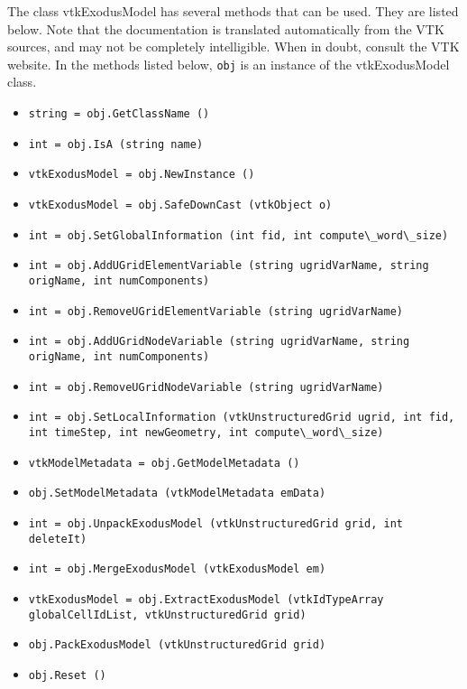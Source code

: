 The class vtkExodusModel has several methods that can be used.
  They are listed below.
Note that the documentation is translated automatically from the VTK sources,
and may not be completely intelligible.  When in doubt, consult the VTK website.
In the methods listed below, \verb|obj| is an instance of the vtkExodusModel class.
\begin{itemize}
\item  \verb|string = obj.GetClassName ()|

\item  \verb|int = obj.IsA (string name)|

\item  \verb|vtkExodusModel = obj.NewInstance ()|

\item  \verb|vtkExodusModel = obj.SafeDownCast (vtkObject o)|

\item  \verb|int = obj.SetGlobalInformation (int fid, int compute\_word\_size)|

\item  \verb|int = obj.AddUGridElementVariable (string ugridVarName, string origName, int numComponents)|

\item  \verb|int = obj.RemoveUGridElementVariable (string ugridVarName)|

\item  \verb|int = obj.AddUGridNodeVariable (string ugridVarName, string origName, int numComponents)|

\item  \verb|int = obj.RemoveUGridNodeVariable (string ugridVarName)|

\item  \verb|int = obj.SetLocalInformation (vtkUnstructuredGrid ugrid, int fid, int timeStep, int newGeometry, int compute\_word\_size)|

\item  \verb|vtkModelMetadata = obj.GetModelMetadata ()|

\item  \verb|obj.SetModelMetadata (vtkModelMetadata emData)|

\item  \verb|int = obj.UnpackExodusModel (vtkUnstructuredGrid grid, int deleteIt)|

\item  \verb|int = obj.MergeExodusModel (vtkExodusModel em)|

\item  \verb|vtkExodusModel = obj.ExtractExodusModel (vtkIdTypeArray globalCellIdList, vtkUnstructuredGrid grid)|

\item  \verb|obj.PackExodusModel (vtkUnstructuredGrid grid)|

\item  \verb|obj.Reset ()|

\end{itemize}
